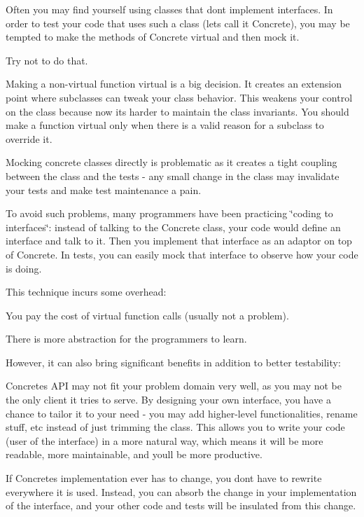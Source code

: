 Often you may find yourself using classes that don\textquotesingle{}t implement interfaces. In order to test your code that uses such a class (let\textquotesingle{}s call it {\ttfamily Concrete}), you may be tempted to make the methods of {\ttfamily Concrete} virtual and then mock it.

Try not to do that.

Making a non-\/virtual function virtual is a big decision. It creates an extension point where subclasses can tweak your class\textquotesingle{} behavior. This weakens your control on the class because now it\textquotesingle{}s harder to maintain the class\textquotesingle{} invariants. You should make a function virtual only when there is a valid reason for a subclass to override it.

Mocking concrete classes directly is problematic as it creates a tight coupling between the class and the tests -\/ any small change in the class may invalidate your tests and make test maintenance a pain.

To avoid such problems, many programmers have been practicing \char`\"{}coding
to interfaces\char`\"{}\+: instead of talking to the {\ttfamily Concrete} class, your code would define an interface and talk to it. Then you implement that interface as an adaptor on top of {\ttfamily Concrete}. In tests, you can easily mock that interface to observe how your code is doing.

This technique incurs some overhead\+:


\begin{DoxyItemize}
\item You pay the cost of virtual function calls (usually not a problem).
\item There is more abstraction for the programmers to learn.
\end{DoxyItemize}

However, it can also bring significant benefits in addition to better testability\+:


\begin{DoxyItemize}
\item {\ttfamily Concrete}\textquotesingle{}s A\+PI may not fit your problem domain very well, as you may not be the only client it tries to serve. By designing your own interface, you have a chance to tailor it to your need -\/ you may add higher-\/level functionalities, rename stuff, etc instead of just trimming the class. This allows you to write your code (user of the interface) in a more natural way, which means it will be more readable, more maintainable, and you\textquotesingle{}ll be more productive.
\item If {\ttfamily Concrete}\textquotesingle{}s implementation ever has to change, you don\textquotesingle{}t have to rewrite everywhere it is used. Instead, you can absorb the change in your implementation of the interface, and your other code and tests will be insulated from this change.
\end{DoxyItemize}

